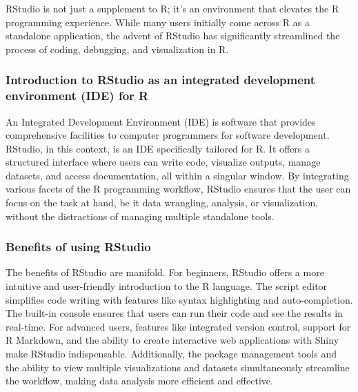 \documentclass[
  b5paper]{book}
\begin{document}
RStudio is not just a supplement to R; it's an environment that elevates the R programming experience. While many users initially come across R as a standalone application, the advent of RStudio has significantly streamlined the process of coding, debugging, and visualization in R.

\hypertarget{introduction-to-rstudio-as-an-integrated-development-environment-ide-for-r}{%
\subsubsection*{Introduction to RStudio as an integrated development environment (IDE) for R}\label{introduction-to-rstudio-as-an-integrated-development-environment-ide-for-r}}

An Integrated Development Environment (IDE) is software that provides comprehensive facilities to computer programmers for software development. RStudio, in this context, is an IDE specifically tailored for R. It offers a structured interface where users can write code, visualize outputs, manage datasets, and access documentation, all within a singular window. By integrating various facets of the R programming workflow, RStudio ensures that the user can focus on the task at hand, be it data wrangling, analysis, or visualization, without the distractions of managing multiple standalone tools.

\hypertarget{benefits-of-using-rstudio}{%
\subsubsection*{Benefits of using RStudio}\label{benefits-of-using-rstudio}}

The benefits of RStudio are manifold. For beginners, RStudio offers a more intuitive and user-friendly introduction to the R language. The script editor simplifies code writing with features like syntax highlighting and auto-completion. The built-in console ensures that users can run their code and see the results in real-time. For advanced users, features like integrated version control, support for R Markdown, and the ability to create interactive web applications with Shiny make RStudio indispensable. Additionally, the package management tools and the ability to view multiple visualizations and datasets simultaneously streamline the workflow, making data analysis more efficient and effective.
\end{document}
